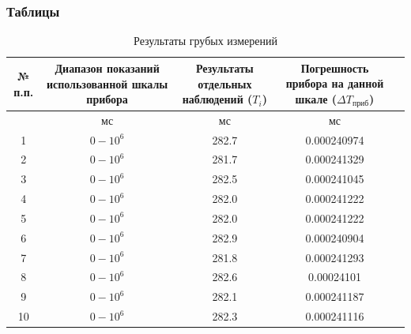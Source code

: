 \clearpage
\subsubsection{Таблицы}
\begin{center}
\begin{table}[h!]
\centering
\caption{Результаты грубых измерений}
\label{tabl:1}
\begin{tabular}{|c|c|c|c|c|}
\hline
\begin{minipage}{7mm}
    № п.п. 
\end{minipage}&
\begin{minipage}{5cm}
    Диапазон показаний использованной шкалы прибора
\end{minipage} &
\begin{minipage}{5cm}
    Результаты отдельных наблюдений ($T_i$)
\end{minipage} &
\begin{minipage}{5cm}
    Погрешность прибора на данной шкале ($\Delta T_{\text{приб}}$)
\end{minipage}\\
\hline
{}&мс&мс&мс\\
\hline
1 &	$0-10^6$ &	282.7 & 0.000240974 \\
2 &	$0-10^6$ &	281.7 & 0.000241329 \\
3 &	$0-10^6$ &	282.5 & 0.000241045 \\
4 &	$0-10^6$ &	282.0 & 0.000241222 \\
5 & $0-10^6$ &	282.0 & 0.000241222 \\
6 & $0-10^6$ &	282.9 & 0.000240904 \\
7 & $0-10^6$ &	281.8 & 0.000241293 \\
8 & $0-10^6$ &	282.6 & 0.00024101 \\
9 & $0-10^6$ &	282.1 & 0.000241187 \\
10& $0-10^6$ &	282.3 & 0.000241116 \\
\hline
\end{tabular}
\end{table}
\end{center}

